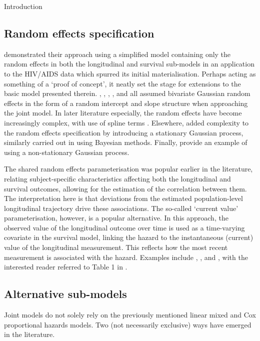 \begin{chapter}{\label{cha:intro}Introduction}
  \subsection{Random effects specification}\label{sec:intro-evolution-REs}
  \citet{Wulfsohn97} demonstrated their approach using a simplified model containing only the random effects in both the longitudinal and survival sub-models in an application to the HIV/AIDS data which spurred its initial materialisation. Perhaps acting as something of a `proof of concept', it neatly set the stage for extensions to the basic model presented therein. \citet{Tsiatis1995}, \citet{Faucett1996}, \citet{Bycott1998}, \citet{Dafni1998}, and \citet{Wulfsohn97} all assumed bivariate Gaussian random effects in the form of a random intercept and slope structure when approaching the joint model. In later literature especially, the random effects have become increasingly complex, with use of \eg spline terms \citep{Martins2022, Rustand2023}. Elsewhere, \citet{Henderson2000} added complexity to the random effects specification by introducing a stationary Gaussian process, similarly carried out in \citet{Xu2001} using Bayesian methods. Finally, \citet{Wang2001} provide an example of using a non-stationary Gaussian process. 

  The shared random effects parameterisation was popular earlier in the literature, relating subject-specific characteristics affecting both the longitudinal and survival outcomes, allowing for the estimation of the correlation between them. The interpretation here is that deviations from the estimated population-level longitudinal trajectory drive these associations. The so-called `current value' parameterisation, however, is a popular alternative. In this approach, the observed value of the longitudinal outcome over time is used as a time-varying covariate in the survival model, linking the hazard to the instantaneous (current) value of the longitudinal measurement. This reflects how the most recent measurement is associated with the hazard. Examples include \citet{Chi2005}, \citet{Lin2002}, and \citet{Andrinopoulou2021}, with the interested reader referred to Table 1 in \citet{Hickey2016}.

  \subsection{Alternative sub-models}\label{sec:intro-evolution-glmm}
  Joint models do not solely rely on the previously mentioned linear mixed and Cox proportional hazards models. Two (not necessarily exclusive) ways have emerged in the literature.


\end{chapter}
